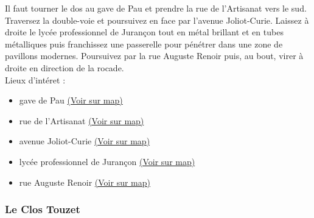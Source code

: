 \documentclass[titlepage]{article}
\begin{document}
                        Il faut tourner le dos au gave de Pau et prendre la rue de l'Artisanat vers le sud. Traversez la double-voie et poursuivez en face par l'avenue Joliot-Curie. Laissez à droite le lycée professionnel de Jurançon tout en métal brillant et en tubes métalliques puis franchissez une passerelle pour pénétrer dans une zone de pavillons modernes. Poursuivez par la rue Auguste Renoir puis, au bout, virer à droite en direction de la rocade. 
                    \\
        Lieux d'intéret : 
        \begin{itemize}
        
        \item {
        gave de
                            Pau 
        \href{https://www.google.com/maps/?q=43.287530, -0.391115}{(Voir sur map)}
        }
    
        \item {
        rue de
                            l'Artisanat 
        \href{https://www.google.com/maps/?q=43.287530, -0.391115}{(Voir sur map)}
        }
    
        \item {
        avenue
                            Joliot-Curie 
        \href{https://www.google.com/maps/?q=43.287530, -0.391115}{(Voir sur map)}
        }
    
        \item {
        lycée professionnel de
                            Jurançon 
        \href{https://www.google.com/maps/?q=43.287530, -0.391115}{(Voir sur map)}
        }
    
        \item {
        rue Auguste
                            Renoir 
        \href{https://www.google.com/maps/?q=43.287530, -0.391115}{(Voir sur map)}
        }
    
        \end{itemize}
    
        
        \subsubsection{Le Clos Touzet}
        \paragraph{}
        
\end{document}
